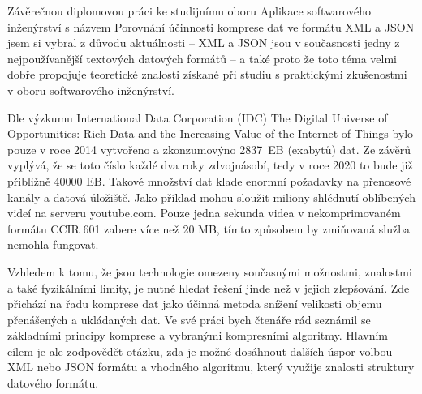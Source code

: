 Závěrečnou diplomovou práci ke studijnímu oboru Aplikace softwarového inženýrství s názvem Porovnání účinnosti komprese dat ve formátu XML a JSON jsem si vybral z důvodu aktuálnosti -- XML a JSON jsou v současnosti jedny z nejpoužívanější textových datových formátů -- a také proto že toto téma velmi dobře propojuje teoretické znalosti získané při studiu s praktickými zkušenostmi v oboru softwarového inženýrství.

Dle výzkumu International Data Corporation (IDC) The Digital Universe of Opportunities: Rich Data and the Increasing Value of the Internet of Things \cite{idc} bylo pouze v roce 2014 vytvořeno a zkonzumovýno 2837~EB (exabytů) dat. Ze závěrů vyplývá, že se toto číslo každé dva roky zdvojnásobí, tedy v roce 2020 to bude již přibližně 40000 EB. Takové množství dat klade enormní požadavky na přenosové kanály a datová úložiště. Jako příklad mohou sloužit miliony shlédnutí oblíbených videí na serveru youtube.com. Pouze jedna sekunda videa v nekomprimovaném formátu CCIR 601 zabere více než 20 MB, tímto způsobem by zmiňovaná služba nemohla fungovat.

Vzhledem k tomu, že jsou technologie omezeny současnými možnostmi, znalostmi a také fyzikálními limity, je nutné hledat řešení jinde než v jejich zlepšování. Zde přichází na řadu komprese dat jako účinná metoda snížení velikosti objemu přenášených a ukládaných dat. Ve své práci bych čtenáře rád seznámil se základními principy komprese a vybranými kompresními algoritmy. Hlavním cílem je ale zodpovědět otázku, zda je možné dosáhnout dalších úspor volbou XML nebo JSON formátu a vhodného algoritmu, který využije znalosti struktury datového formátu.

